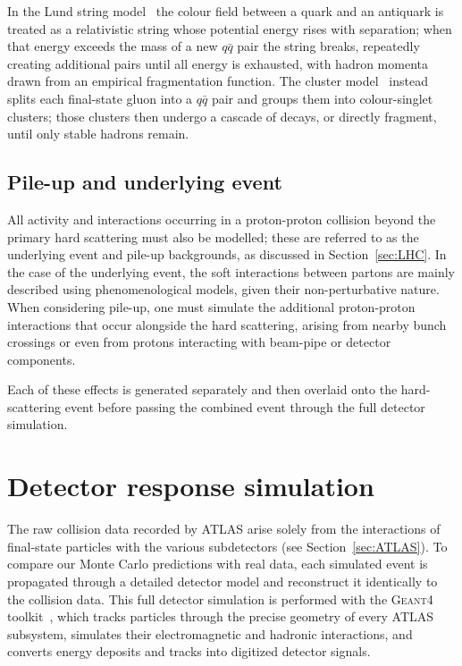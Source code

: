 In the Lund string model~\cite{ANDERSSON198331} the colour field between a quark and an antiquark is treated as a relativistic string whose potential energy rises with separation; when that energy exceeds the mass of a new $q\bar{q}$ pair the string breaks, repeatedly creating additional pairs until all energy is exhausted, with hadron momenta drawn from an empirical fragmentation function. 
The cluster model~\cite{Winter_2004} instead splits each final-state gluon into a $q\bar{q}$ pair and groups them into colour-singlet clusters; those clusters then undergo a cascade of decays, or directly fragment, until only stable hadrons remain.

\subsection*{Pile-up and underlying event}
\label{subsec:Pile}

All activity and interactions occurring in a proton-proton collision beyond the primary hard scattering must also be modelled; these are referred to as the underlying event and pile-up backgrounds, as discussed in Section~\ref{sec:LHC}. 
In the case of the underlying event, the soft interactions between partons are mainly described using phenomenological models, given their non-perturbative nature. When considering pile-up, one must simulate the additional proton-proton interactions that occur alongside the hard scattering, arising from nearby bunch crossings or even from protons interacting with beam-pipe or detector components.

Each of these effects is generated separately and then overlaid onto the hard-scattering event before passing the combined event through the full detector simulation.



\section{Detector response simulation}
\label{sec:Detector}

The raw collision data recorded by ATLAS arise solely from the interactions of final-state particles with the various subdetectors (see Section~\ref{sec:ATLAS}). To compare our Monte Carlo predictions with real data, each simulated event is propagated through a detailed detector model and reconstruct it identically to the collision data.  This full detector simulation is performed with the \textsc{Geant4} toolkit~\cite{AGOSTINELLI2003250}, which tracks particles through the precise geometry of every ATLAS subsystem, simulates their electromagnetic and hadronic interactions, and converts energy deposits and tracks into digitized detector signals.

